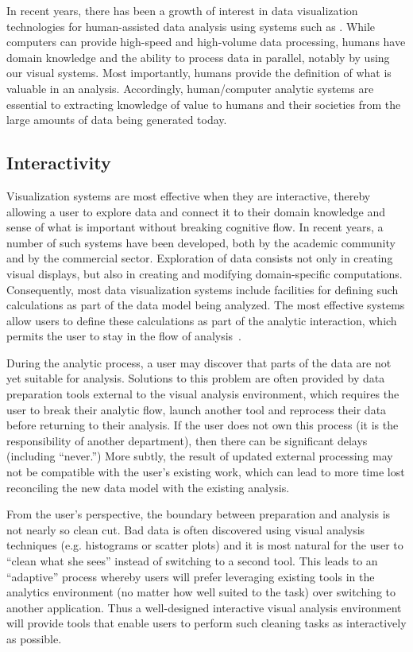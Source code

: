In recent years, there has been a growth of interest in data visualization technologies for human-assisted data analysis using systems such as \cite{Stolte:2008,Qlik,Ahlberg:1996}. While computers can provide high-speed and high-volume data processing, humans have domain knowledge and the ability to process data in parallel, notably by using our visual systems. Most importantly, humans provide the definition of what is valuable in an analysis. Accordingly, human/computer analytic systems are essential to extracting knowledge of value to humans and their societies from the large amounts of data being generated today.


\subsection{Interactivity}
Visualization systems are most effective when they are interactive, thereby allowing a user to explore data and connect it to their domain knowledge and sense of what is important without breaking cognitive flow. In recent years, a number of such systems have been developed, both by the academic community and by the commercial sector. Exploration of data consists not only in creating visual displays, but also in creating and modifying domain-specific computations. Consequently, most data visualization systems include facilities for defining such calculations as part of the data model being analyzed. The most effective systems allow users to define these calculations as part of the analytic interaction, which permits the user to stay in the flow of analysis~\cite{Morton:2012}.

During the analytic process, a user may discover that parts of the data are not yet suitable for analysis. Solutions to this problem are often provided by data preparation tools external to the visual analysis environment, which requires the user to break their analytic flow, launch another tool and reprocess their data before returning to their analysis. If the user does not own this process (\eg it is the responsibility of another department), then there can be significant delays (including ``never.'') More subtly, the result of updated external processing may not be compatible with the user's existing work, which can lead to more time lost reconciling the new data model with the existing analysis.

From the user's perspective, the boundary between preparation and analysis is not nearly so clean cut. Bad data is often discovered using visual analysis techniques (e.g. histograms or scatter plots) and it is most natural for the user to ``clean what she sees'' instead of switching to a second tool. This leads to an ``adaptive'' process whereby users will prefer leveraging existing tools in the analytics environment (no matter how well suited to the task) over switching to another application. Thus a well-designed interactive visual analysis environment will provide tools that enable users to perform such cleaning tasks as interactively as possible.

